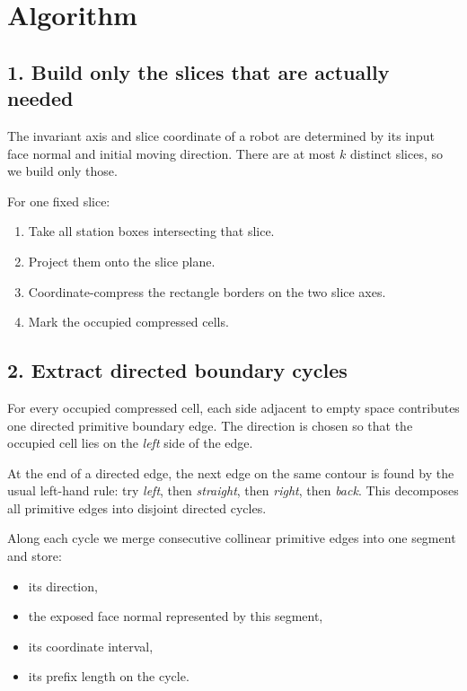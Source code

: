 \documentclass[11pt]{article}
\begin{document}
\section*{Algorithm}

\subsection*{1. Build only the slices that are actually needed}

The invariant axis and slice coordinate of a robot are determined by its input face normal and initial moving
direction. There are at most $k$ distinct slices, so we build only those.

For one fixed slice:
\begin{enumerate}[leftmargin=*]
    \item Take all station boxes intersecting that slice.
    \item Project them onto the slice plane.
    \item Coordinate-compress the rectangle borders on the two slice axes.
    \item Mark the occupied compressed cells.
\end{enumerate}

\subsection*{2. Extract directed boundary cycles}

For every occupied compressed cell, each side adjacent to empty space contributes one directed primitive boundary edge.
The direction is chosen so that the occupied cell lies on the \emph{left} side of the edge.

At the end of a directed edge, the next edge on the same contour is found by the usual left-hand rule:
try \emph{left}, then \emph{straight}, then \emph{right}, then \emph{back}.
This decomposes all primitive edges into disjoint directed cycles.

Along each cycle we merge consecutive collinear primitive edges into one segment and store:
\begin{itemize}[leftmargin=*]
    \item its direction,
    \item the exposed face normal represented by this segment,
    \item its coordinate interval,
    \item its prefix length on the cycle.
\end{itemize}
\end{document}
